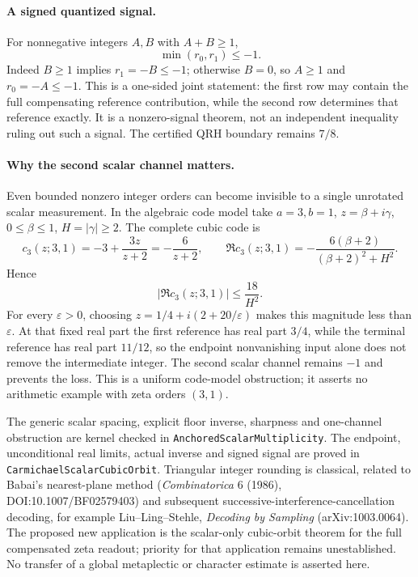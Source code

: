 \paragraph{A signed quantized signal.}
For nonnegative integers \(A,B\) with \(A+B\ge1\),
\[
 \min(r_0,r_1)\le-1.
\]
Indeed \(B\ge1\) implies \(r_1=-B\le-1\); otherwise \(B=0\), so
\(A\ge1\) and \(r_0=-A\le-1\). This is a one-sided joint statement:
the first row may contain the full compensating reference contribution,
while the second row determines that reference exactly.
It is a nonzero-signal theorem, not an independent inequality ruling out
such a signal. The certified QRH boundary remains \(7/8\).

\paragraph{Why the second scalar channel matters.}
Even bounded nonzero integer orders can become invisible to a single
unrotated scalar measurement. In the algebraic code model take
\(a=3,b=1\), \(z=\beta+i\gamma\), \(0\le\beta\le1\), \(H=|\gamma|\ge2\).
The complete cubic code is
\[
 c_3(z;3,1)=-3+\frac{3z}{z+2}=-\frac6{z+2},\qquad
 \Re c_3(z;3,1)=-\frac{6(\beta+2)}{(\beta+2)^2+H^2}.
\]
Hence
\[
 |\Re c_3(z;3,1)|\le\frac{18}{H^2}.
\]
For every \(\varepsilon>0\), choosing
\(z=1/4+i(2+20/\varepsilon)\) makes this magnitude less than
\(\varepsilon\). At that fixed real part the first reference has real part
\(3/4\), while the terminal reference has real part \(11/12\), so the
endpoint nonvanishing input alone does not remove the intermediate integer.
The second scalar channel remains \(-1\) and prevents the loss.
This is a uniform code-model obstruction; it asserts no arithmetic example
with zeta orders \((3,1)\).

The generic scalar spacing, explicit floor inverse, sharpness and one-channel
obstruction are kernel checked in \texttt{AnchoredScalarMultiplicity}.
The endpoint, unconditional real limits, actual inverse and signed signal
are proved in \texttt{CarmichaelScalarCubicOrbit}.
Triangular integer rounding is classical, related to Babai's nearest-plane
method (\emph{Combinatorica} 6 (1986), DOI:10.1007/BF02579403) and subsequent
successive-interference-cancellation decoding, for example Liu--Ling--Stehle,
\emph{Decoding by Sampling} (arXiv:1003.0064). The proposed new application is
the scalar-only cubic-orbit theorem for the full compensated zeta readout;
priority for that application remains unestablished. No transfer of a global
metaplectic or character estimate is asserted here.

